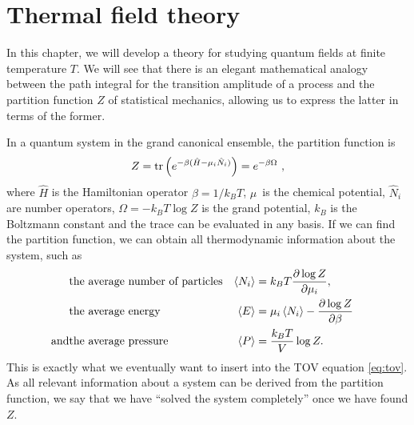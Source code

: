 \chapter{Thermal field theory}



\newcommand{\transampl}{\braket{\phi_B | e^{- i \hat{H} T / \hbar} | \phi_A}}

In this chapter, we will develop a theory for studying quantum fields at finite temperature $T$.
We will see that there is an elegant mathematical analogy between the path integral for the transition amplitude of a process and the partition function $Z$ of statistical mechanics, allowing us to express the latter in terms of the former.

In a quantum system in the grand canonical ensemble, the partition function is 
\begin{equation}
	Z = \trace \left( e^{-\beta (\hat{H} - \mu_i \hat{N}_i)} \right) = e^{-\beta \Omega} ,
\label{eq:tft:partition_function}
\end{equation}
where $\hat{H}$ is the Hamiltonian operator $\beta = 1 / k_B T$, $\mu$ is the chemical potential, $\hat{N}_i$ are number operators, $\Omega = -k_B T \log{Z}$ is the grand potential, $k_B$ is the Boltzmann constant and the trace can be evaluated in any basis.
If we can find the partition function, we can obtain all thermodynamic information about the system, such as \cite[chapter 5]{ref:jensoluf}
\begin{align}
	           & \text{the average number of particles} & \thermalavg{N_i} & = k_B T \pdv{\log{Z}}{\mu_i},                    & \\
	           & \text{the average energy}              & \thermalavg{E}   & = \mu_i \thermalavg{N_i} - \pdv{\log{Z}}{\beta}  & \\ %
	\text{and} & \text{the average pressure}            & \thermalavg{P}   & = \frac{k_B T}{V} \log{Z}.                       &    %
\end{align}
This is exactly what we eventually want to insert into the TOV equation \eqref{eq:tov}.
As all relevant information about a system can be derived from the partition function, we say that we have ``solved the system completely'' once we have found $Z$.

